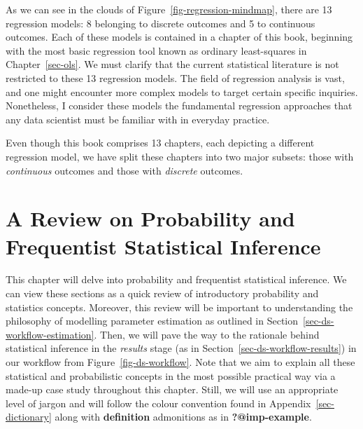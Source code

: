 \documentclass[
  letterpaper,
  DIV=11,
  numbers=noendperiod]{scrreprt}
\begin{document}
As we can see in the clouds of Figure~\ref{fig-regression-mindmap},
there are 13 regression models: 8 belonging to discrete outcomes and 5
to continuous outcomes. Each of these models is contained in a chapter
of this book, beginning with the most basic regression tool known as
ordinary least-squares in Chapter~\ref{sec-ols}. We must clarify that
the current statistical literature is not restricted to these 13
regression models. The field of regression analysis is vast, and one
might encounter more complex models to target certain specific
inquiries. Nonetheless, I consider these models the fundamental
regression approaches that any data scientist must be familiar with in
everyday practice.

Even though this book comprises 13 chapters, each depicting a different
regression model, we have split these chapters into two major subsets:
those with \emph{continuous} outcomes and those with \emph{discrete}
outcomes.


\chapter{A Review on Probability and Frequentist Statistical
Inference}\label{sec-stats-review}

This chapter will delve into probability and frequentist statistical
inference. We can view these sections as a quick review of introductory
probability and statistics concepts. Moreover, this review will be
important to understanding the philosophy of modelling parameter
estimation as outlined in Section~\ref{sec-ds-workflow-estimation}.
Then, we will pave the way to the rationale behind statistical inference
in the \emph{results} stage (as in
Section~\ref{sec-ds-workflow-results}) in our workflow from
Figure~\ref{fig-ds-workflow}. Note that we aim to explain all these
statistical and probabilistic concepts in the most possible practical
way via a made-up case study throughout this chapter. Still, we will use
an appropriate level of jargon and will follow the colour convention
found in Appendix~\ref{sec-dictionary} along with \textbf{definition}
admonitions as in \textbf{?@imp-example}.
\end{document}
